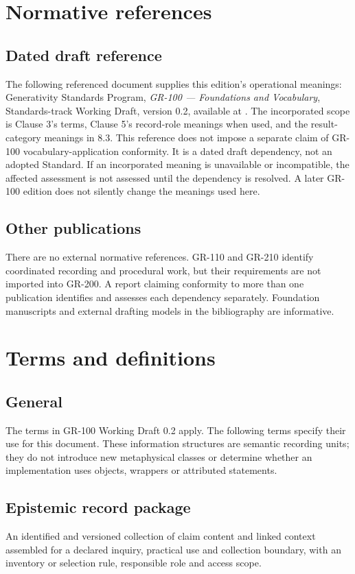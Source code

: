 \documentclass[11pt,a4paper]{article}
\begin{document}
\section{Normative references}
\subsection{Dated draft reference}
The following referenced document supplies this edition's operational meanings: Generativity Standards Program, \emph{GR-100 --- Foundations and Vocabulary}, Standards-track Working Draft, version 0.2, available at . The incorporated scope is Clause 3's terms, Clause 5's record-role meanings when used, and the result-category meanings in 8.3. This reference does not impose a separate claim of GR-100 vocabulary-application conformity. It is a dated draft dependency, not an adopted Standard. If an incorporated meaning is unavailable or incompatible, the affected assessment is not assessed until the dependency is resolved. A later GR-100 edition does not silently change the meanings used here.

\subsection{Other publications}
There are no external normative references. GR-110 and GR-210 identify coordinated recording and procedural work, but their requirements are not imported into GR-200. A report claiming conformity to more than one publication identifies and assesses each dependency separately. Foundation manuscripts and external drafting models in the bibliography are informative.

\section{Terms and definitions}
\subsection{General}
The terms in GR-100 Working Draft 0.2 apply. The following terms specify their use for this document. These information structures are semantic recording units; they do not introduce new metaphysical classes or determine whether an implementation uses objects, wrappers or attributed statements.

\subsection{Epistemic record package}
An identified and versioned collection of claim content and linked context assembled for a declared inquiry, practical use and collection boundary, with an inventory or selection rule, responsible role and access scope.
\end{document}
